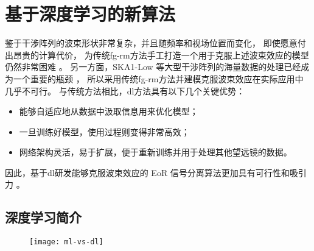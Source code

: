 \section{基于深度学习的新算法}

鉴于干涉阵列的波束形状非常复杂，并且随频率和视场位置而变化，
即使愿意付出昂贵的计算代价，
为传统\ac{fg-rm}方法手工打造一个用于克服上述波束效应的模型仍然非常困难
\cite{lochner2015}。
另一方面，SKA1-Low 等大型干涉阵列的海量数据的处理已经成为一个重要的瓶颈
\cite{norris2011,dolensky2016,chrysostomou2018}，
所以采用传统\ac{fg-rm}方法并建模克服波束效应在实际应用中几乎不可行。
与传统方法相比，\ac{dl}方法具有以下几个关键优势：
\begin{itemize}
  \item 能够自适应地从数据中汲取信息用来优化模型；
  \item 一旦训练好模型，使用过程则变得非常高效；
  \item 网络架构灵活，易于扩展，便于重新训练并用于处理其他望远镜的数据。
\end{itemize}
因此，基于\ac{dl}研发能够克服波束效应的 EoR 信号分离算法更加具有可行性和吸引力
\cite{herbel2018,vafaeiSadr2019}。

\subsection{深度学习简介}

\begin{figure}[htp]
  \centering
  \texttt{[image: ml-vs-dl]}
  \label{fig:ml-dl}
\end{figure}

